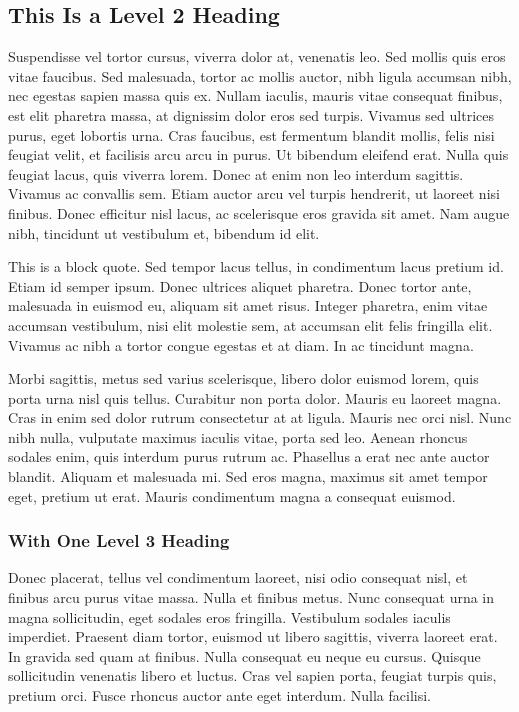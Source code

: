 \subsection{This Is a Level 2 Heading}

Suspendisse vel tortor cursus, viverra dolor at, venenatis leo. Sed mollis quis eros vitae faucibus. Sed malesuada, tortor ac mollis auctor, nibh ligula accumsan nibh, nec egestas sapien massa quis ex. Nullam iaculis, mauris vitae consequat finibus, est elit pharetra massa, at dignissim dolor eros sed turpis. Vivamus sed ultrices purus, eget lobortis urna. Cras faucibus, est fermentum blandit mollis, felis nisi feugiat velit, et facilisis arcu arcu in purus. Ut bibendum eleifend erat. Nulla quis feugiat lacus, quis viverra lorem. Donec at enim non leo interdum sagittis. Vivamus ac convallis sem. Etiam auctor arcu vel turpis hendrerit, ut laoreet nisi finibus. Donec efficitur nisl lacus, ac scelerisque eros gravida sit amet. Nam augue nibh, tincidunt ut vestibulum et, bibendum id elit.

\begin{MAEquote}
This is a block quote. Sed tempor lacus tellus, in condimentum lacus pretium id. Etiam id semper ipsum. Donec ultrices aliquet pharetra. Donec tortor ante, malesuada in euismod eu, aliquam sit amet risus. Integer pharetra, enim vitae accumsan vestibulum, nisi elit molestie sem, at accumsan elit felis fringilla elit. Vivamus ac nibh a tortor congue egestas et at diam. In ac tincidunt magna.
\end{MAEquote}

Morbi sagittis, metus sed varius scelerisque, libero dolor euismod lorem, quis porta urna nisl quis tellus. Curabitur non porta dolor. Mauris eu laoreet magna. Cras in enim sed dolor rutrum consectetur at at ligula. Mauris nec orci nisl. Nunc nibh nulla, vulputate maximus iaculis vitae, porta sed leo. Aenean rhoncus sodales enim, quis interdum purus rutrum ac. Phasellus a erat nec ante auctor blandit. Aliquam et malesuada mi. Sed eros magna, maximus sit amet tempor eget, pretium ut erat. Mauris condimentum magna a consequat euismod.

\subsubsection{With One Level 3 Heading}

Donec placerat, tellus vel condimentum laoreet, nisi odio consequat nisl, et finibus arcu purus vitae massa. Nulla et finibus metus. Nunc consequat urna in magna sollicitudin, eget sodales eros fringilla. Vestibulum sodales iaculis imperdiet. Praesent diam tortor, euismod ut libero sagittis, viverra laoreet erat. In gravida sed quam at finibus. Nulla consequat eu neque eu cursus. Quisque sollicitudin venenatis libero et luctus. Cras vel sapien porta, feugiat turpis quis, pretium orci. Fusce rhoncus auctor ante eget interdum. Nulla facilisi.

